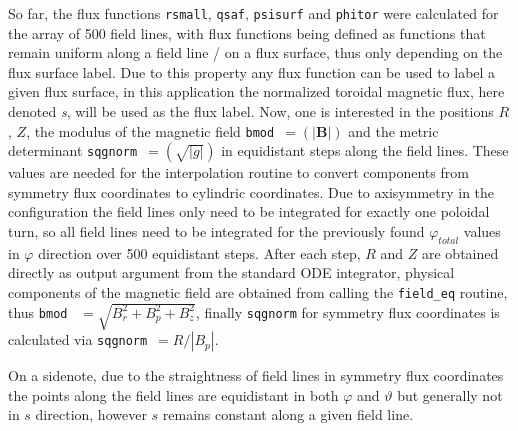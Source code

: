 \documentclass[./main.tex]{subfiles}
\begin{document}
So far, the flux functions \texttt{rsmall}, \texttt{qsaf}, \texttt{psisurf} and \texttt{phitor} were calculated for the array of 500 field lines, with flux functions being defined as functions that remain uniform along a field line / on a flux surface, thus only depending on the flux surface label. Due to this property any flux function can be used to label a given flux surface, in this application the normalized toroidal magnetic flux, here denoted \textit{s}, will be used as the flux label. Now, one is interested in the positions $R$, $Z$, the modulus of the magnetic field \texttt{bmod}~$=(|\mathbf{B}|)$ and the metric determinant \texttt{sqgnorm}~$=(\sqrt{|g|})$ in equidistant steps along the field lines. These values are needed for the interpolation routine to convert components from symmetry flux coordinates to cylindric coordinates.
Due to axisymmetry in the configuration the field lines only need to be integrated for exactly one poloidal turn, so all field lines need to be integrated for the previously found $\varphi_{total}$ values in $\varphi$ direction over 500 equidistant steps. After each step, $R$ and $Z$ are obtained directly as output argument from the standard ODE integrator, physical components of the magnetic field are obtained from calling the \texttt{field\_eq} routine, thus \texttt{bmod} ~$= \sqrt{B_r^2+B_p^2+B_z^2}$, finally \texttt{sqgnorm} for symmetry flux coordinates is calculated via \texttt{sqgnorm}~$ = R/|B_p|$. 

On a sidenote, due to the straightness of field lines in symmetry flux coordinates the points along the field lines are equidistant in both $\varphi$ and $\vartheta$ but generally not in $s$ direction, however $s$ remains constant along a given field line.
\end{document}
